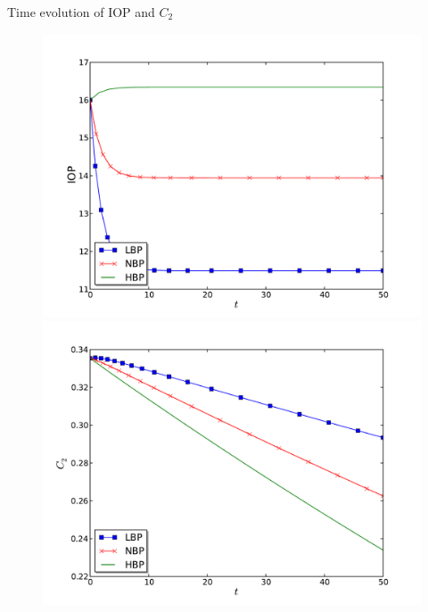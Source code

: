 \begin{frame}{Time evolution of IOP and $C_2$}
\begin{figure}[H]
\begin{minipage}{0.45\linewidth}
\includegraphics[scale=0.27]{images/IOP_time}
\end{minipage}\hfill
\begin{minipage}{0.45\linewidth}
\includegraphics[scale=0.27]{images/C2_time}
\end{minipage}
\end{figure}

\end{frame}

